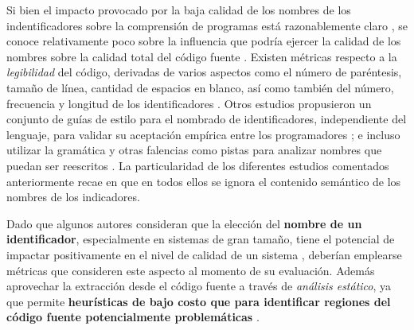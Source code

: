 Si bien el impacto provocado por la baja calidad de los nombres de los indentificadores sobre
la comprensión de programas está razonablemente claro \cite{DeiBenbockPizka05,Lawrie2007,Lawrie2006},
se conoce relativamente poco sobre la influencia que podría ejercer la calidad de los nombres
sobre la calidad total del código fuente \cite{ButlerWemelingerYu10}.
Existen métricas respecto a la \textit{legibilidad} del código, derivadas de varios aspectos como el
número de paréntesis, tamaño de línea, cantidad de espacios en blanco, así como también del
número, frecuencia y longitud de los identificadores \cite{Buse2008}.
Otros estudios propusieron un conjunto de guías de estilo para el nombrado
de identificadores, independiente del lenguaje, para validar su aceptación empírica entre los
programadores \cite{ref}; e incluso utilizar la gramática y otras falencias como pistas para
analizar nombres que puedan ser reescritos \cite{ads}.
La particularidad de los diferentes estudios comentados anteriormente recae en que
en todos ellos se ignora el contenido semántico de los nombres de los indicadores.

Dado que algunos autores consideran que la elección del \textbf{nombre de un identificador},
especialmente en sistemas de gran tamaño, tiene el potencial de impactar positivamente en el 
nivel de calidad de un sistema \cite{Relf04}, deberían emplearse métricas que consideren este aspecto
al momento de su evaluación.
Además aprovechar la extracción desde el código fuente a través de \textit{análisis estático},
ya que permite \textbf{heurísticas de bajo costo que para identificar regiones del código fuente 
potencialmente problemáticas} \cite{ButlerWemelingerYu10}.
